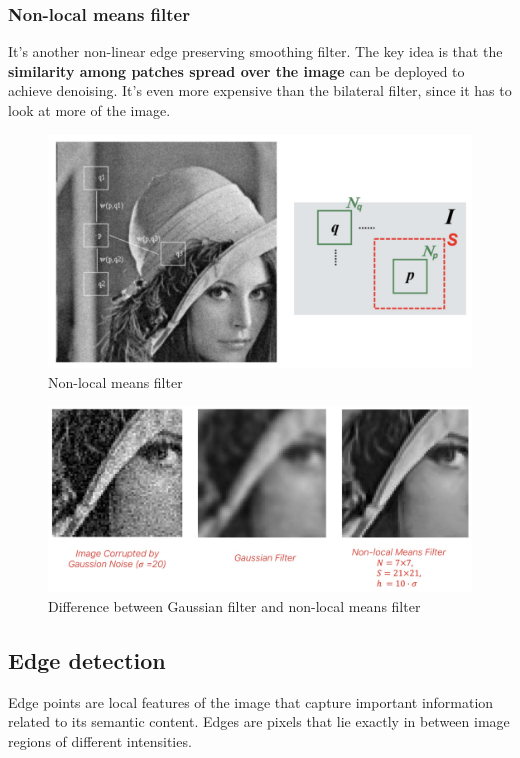 \subsubsection{Non-local means filter}

It's another non-linear edge preserving smoothing filter.
The key idea is that the \textbf{similarity among patches spread over the image} can be deployed to achieve denoising.
It's even more expensive than the bilateral filter, since it has to look at more of the image.

\begin{figure}[htbp]
  \centering
  \includegraphics[width=0.7\linewidth]{./img/nonlocalmeans_filter.jpg}
  \caption{Non-local means filter}
  \label{fig:nonlocalmeans_filter}
\end{figure}

\begin{figure}[htbp]
  \centering
  \includegraphics[width=0.7\linewidth]{./img/nonlocalmeans_comparison.jpg}
  \caption{Difference between Gaussian filter and non-local means filter}
  \label{fig:nonlocalmeans_comparison}
\end{figure}

\subsection{Edge detection}

Edge points are local features of the image that capture important information related to its semantic content.
Edges are pixels that lie exactly in between image regions of different intensities.

